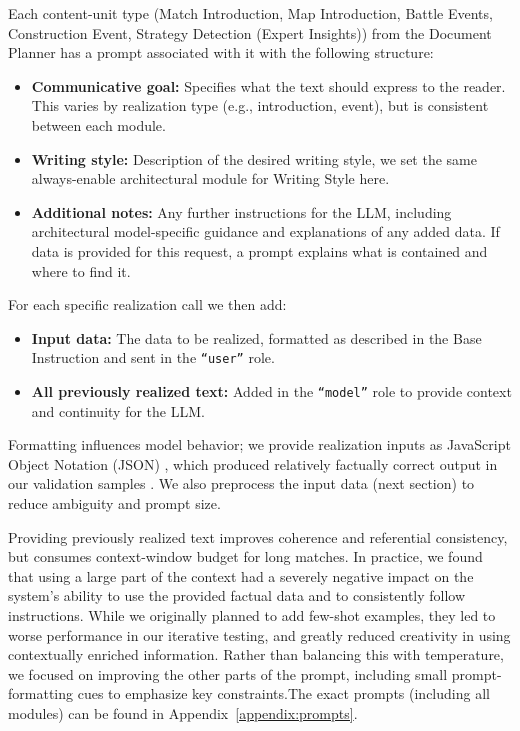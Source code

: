 Each content-unit type (Match Introduction, Map Introduction, Battle Events, Construction Event, Strategy Detection (Expert Insights)) from the Document Planner has a prompt associated with it with the following structure:
\begin{itemize}
  \item \textbf{Communicative goal:} Specifies what the text should express to the reader. This varies by realization type (e.g., introduction, event), but is consistent between each module.
  \item \textbf{Writing style:} Description of the desired writing style, we set the same always-enable architectural module for Writing Style here.
  \item \textbf{Additional notes:} Any further instructions for the LLM, including architectural model-specific guidance and explanations of any added data. If data is provided for this request, a prompt explains what is contained and where to find it.
\end{itemize}

For each specific realization call we then add:
\begin{itemize}
  \item \textbf{Input data:} The data to be realized, formatted as described in the Base Instruction and sent in the \texttt{``user''} role.
  \item \textbf{All previously realized text:} Added in the \texttt{``model''} role to provide context and continuity for the LLM.
\end{itemize}

Formatting influences model behavior; we provide realization inputs as JavaScript Object Notation (JSON) \cite{he2024}, which produced relatively factually correct output in our validation samples \cite{gemini2025}. We also preprocess the input data (next section) to reduce ambiguity and prompt size.

Providing previously realized text improves coherence and referential consistency, but consumes context-window budget for long matches. In practice, we found that using a large part of the context had a severely negative impact on the system's ability to use the provided factual data and to consistently follow instructions. While we originally planned to add few-shot examples, they led to worse performance in our iterative testing, and greatly reduced creativity in using contextually enriched information. Rather than balancing this with temperature, we focused on improving the other parts of the prompt, including small prompt-formatting cues to emphasize key constraints.The exact prompts (including all modules) can be found in Appendix~\ref{appendix:prompts}.

